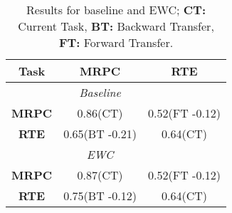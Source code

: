 \documentclass[11pt,a4paper]{article}
\begin{document}








\begin{table}[h!]
\centering
 \begin{tabular}{|c|c|c|} 
 \hline
 \textbf{Task} & \textbf{MRPC} & \textbf{RTE}  \\
 \hline\hline
 & \textit{Baseline} & \\
 \hline
 \textbf{MRPC} & 0.86(CT) & 0.52(FT -0.12) \\ 
 \hline
 \textbf{RTE} & 0.65(BT -0.21) & 0.64(CT) \\ %
 \hline
 & \textit{EWC} & \\ 
 \hline\hline
 \textbf{MRPC} & 0.87(CT) & 0.52(FT -0.12) \\ 
 \hline
 \textbf{RTE} & 0.75(BT -0.12) & 0.64(CT) \\ %
 \hline
\end{tabular}


\caption{\label{base-table} Results for baseline and EWC; \textbf{CT:} Current Task, \textbf{BT:} Backward Transfer, \textbf{FT:} Forward Transfer. 
 }
\end{table}
\end{document}

